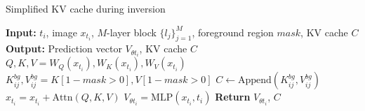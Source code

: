 \begin{algorithm}[t]
\caption{Simplified KV cache during inversion}
\begin{algorithmic}[1]
\State \textbf{Input:} $t_{i}$, image $x_{t_{i}}$, $M$-layer block $\{ l_j \}_{j=1}^{M}$, foreground region $mask$, KV cache $C$
\State \textbf{Output:} Prediction vector $V_{\theta t_{i}}$, KV cache $C$
    \State $Q, K, V = W_Q(x_{t_{i}}), W_K(x_{t_{i}}), W_V(x_{t_{i}})$
    \State $K^{bg}_{ij}, V^{bg}_{ij} = K[1-mask>0], V[1-mask>0]$
    \State $C \gets \text{Append}(K^{bg}_{ij}, V^{bg}_{ij})$
    \State $x_{t_{i}} = x_{t_{i}} + \text{Attn}(Q, K, V)$
\EndFor
\State $V_{\theta t_{i}} = \text{MLP}(x_{t_{i}}, t_{i})$
\State \textbf{Return} $V_{\theta t_{i}}$, $C$
\end{algorithmic}
\label{algorithm:algorithm1}
\end{algorithm}
